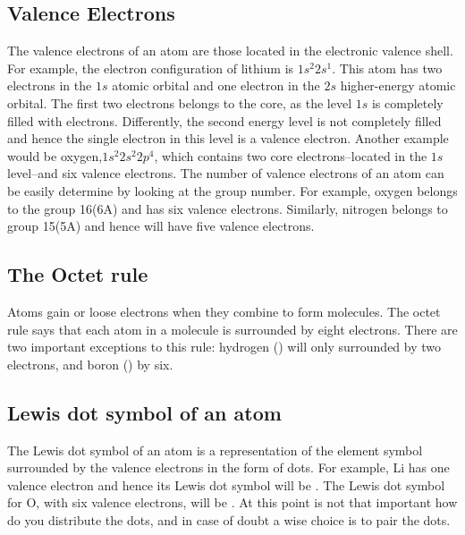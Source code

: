 \documentclass[main.tex]{subfiles}
\begin{document}
\subsection*{Valence Electrons}
The valence electrons of an atom are those located in the electronic valence shell. For example, the electron configuration of lithium is $1s^2 2s^1$. This atom has two electrons in the $1s$ atomic orbital and one electron in the $2s$ higher-energy atomic orbital. The first two electrons belongs to the core, as the level $1s$ is completely filled with electrons. Differently, the second energy level is not completely filled and hence the single electron in this level is a valence electron. Another example would be oxygen,$1s^2 2s^2 2p^4$, which contains two core electrons--located in the $1s$ level--and six valence electrons. The number of valence electrons of an atom can be easily determine by looking at the group number. For example, oxygen belongs to the group 16(6A) and has six valence electrons. Similarly, nitrogen belongs to group 15(5A) and hence will have five valence electrons.
\subsection*{The Octet rule} Atoms gain or loose electrons when they combine to form molecules. The octet rule says that each atom in a molecule is surrounded by eight electrons. There are two important exceptions to this rule: hydrogen () will only surrounded by two electrons, and boron () by six.
\subsection*{Lewis dot symbol of an atom}
The Lewis dot symbol of an atom is a representation of the element symbol surrounded by the valence electrons in the form of dots. For example, Li has one valence electron and hence its Lewis dot symbol will be \hspace{0.1cm}\hspace{0.1cm}. The Lewis dot symbol for O, with six valence electrons, will be \hspace{0.1cm}\hspace{0.1cm}. At this point is not that important how do you distribute the dots, and in case of doubt a wise choice is to pair the dots.
\end{document}
